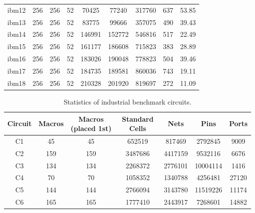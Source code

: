 \documentclass{article}
\theoremstyle{plain}
\theoremstyle{definition}
\theoremstyle{remark}
\begin{document}
\begin{table}[!ht]
\begin{tabular}{ccccccccc}
        ibm12 & 256 & 256 & 52 & 70425 & 77240 & 317760 & 637 & 53.85  \\ 
        ibm13 & 256 & 256 & 52 & 83775 & 99666 & 357075 & 490 & 39.43  \\ 
        ibm14 & 256 & 256 & 52 & 146991 & 152772 & 546816 & 517 & 22.49  \\ 
        ibm15 & 256 & 256 & 52 & 161177 & 186608 & 715823 & 383 & 28.89  \\ 
        ibm16 & 256 & 256 & 52 & 183026 & 190048 & 778823 & 504 & 39.46  \\ 
        ibm17 & 256 & 256 & 52 & 184735 & 189581 & 860036 & 743 & 19.11  \\ 
        ibm18 & 256 & 256 & 52 & 210328 & 201920 & 819697 & 272 & 11.09 \\ 
		\bottomrule
	\end{tabular}
	
\end{table}

\begin{table}[!ht]
 \small
	\caption{Statistics of industrial benchmark circuits.}
	\label{statistics-industrial}
	\centering
	\begin{tabular}{ccccccc}
		\toprule
		Circuit & Macros & Macros (placed 1st) & Standard Cells & Nets & Pins & Ports  \\
		\midrule
        C1 & 45 & 45 & 652519 & 817469 & 2792845 & 9009  \\ 
        C2 & 159 & 159 & 3487686 & 4417159 & 9532116 & 6676  \\ 
        C3 & 134 & 134 & 2268372 & 2776101 & 10004114 & 1416  \\ 
        C4 & 70 & 70 & 1058352 & 1340788 & 4256481 & 27120  \\ 
        C5 & 144 & 144 & 2766094 & 3143780 & 11519226 & 11174 \\ 
        C6 & 165 & 165 & 1777410 & 2443917 & 7268601 & 14882\\
		\bottomrule
	\end{tabular}

\end{table}
\end{document}
